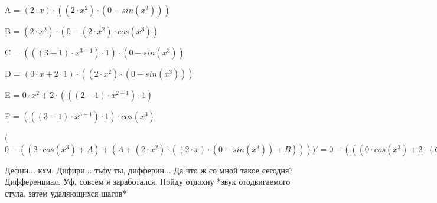 \documentclass[12pt,a4paper,fleqn]{article}
\begin{document}
\begin{center}
A = $(2 \cdot x) \cdot ((2 \cdot x^{2}) \cdot (0-sin(x^{3})))$\end{center}
\begin{center}
B = $(2 \cdot x^{2}) \cdot (0-(2 \cdot x^{2}) \cdot cos(x^{3}))$\end{center}
\begin{center}
C = $(((3-1) \cdot x^{3-1}) \cdot 1) \cdot (0-sin(x^{3}))$\end{center}
\begin{center}
D = $(0 \cdot x+2 \cdot 1) \cdot ((2 \cdot x^{2}) \cdot (0-sin(x^{3})))$\end{center}
\begin{center}
E = $0 \cdot x^{2}+2 \cdot (((2-1) \cdot x^{2-1}) \cdot 1)$\end{center}
\begin{center}
F = $(((3-1) \cdot x^{3-1}) \cdot 1) \cdot cos(x^{3})$\end{center}
\begin{center}
 ($0-((2 \cdot cos(x^{3})+A)+(A+(2 \cdot x^{2}) \cdot ((2 \cdot x) \cdot (0-sin(x^{3}))+B))))'
  = 0-(((0 \cdot cos(x^{3})+2 \cdot (C))+(D+(2 \cdot x) \cdot ((E) \cdot (0-sin(x^{3}))+(2 \cdot x^{2}) \cdot (0-F))))+((D+(2 \cdot x) \cdot ((E) \cdot (0-sin(x^{3}))+(2 \cdot x^{2}) \cdot (0-F)))+((E) \cdot ((2 \cdot x) \cdot (0-sin(x^{3}))+B)+(2 \cdot x^{2}) \cdot (((0 \cdot x+2 \cdot 1) \cdot (0-sin(x^{3}))+(2 \cdot x) \cdot (0-F))+((E) \cdot (0-(2 \cdot x^{2}) \cdot cos(x^{3}))+(2 \cdot x^{2}) \cdot (0-((E) \cdot cos(x^{3})+(2 \cdot x^{2}) \cdot (C))))))))$\end{center}
Дефии... кхм, Дифири... тьфу ты, дифферин... Да что ж со мной такое сегодня? Дифференциал. Уф, совсем я заработался. Пойду отдохну *звук отодвигаемого стула, затем удаляющихся шагов*
\end{document}
